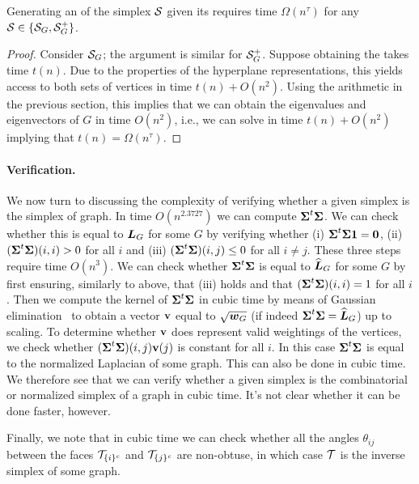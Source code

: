 \begin{lemma}
	\label{lem:hdesc_to_vdesc}
	Generating an \vdesc of the simplex $\mathcal{S}$ given its \hdesc requires time $\Omega(n^\tau)$ for any $\mathcal{S}\in\{\mathcal{S}_G,\mathcal{S}_G^+\}$. 
\end{lemma}
\begin{proof}
	Consider $\mathcal{S}_G$; the argument is similar for $\mathcal{S}_G^+$. Suppose obtaining the \hdesc takes time $t(n)$. Due to the properties of the hyperplane representations, this yields access to both sets of vertices in time $t(n)+O(n^2)$. Using the arithmetic in the previous section, this implies that we can obtain the eigenvalues and eigenvectors of $G$ in time $O(n^2)$, i.e., we can solve \lapdecomp in time $t(n)+O(n^2)$ implying that $t(n)=\Omega(n^\tau)$. 
\end{proof}


\paragraph{Verification.}
We  now turn  to discussing the complexity of  verifying whether  a given simplex is the simplex of graph. 
In time $O(n^{2.3727})$ we can compute $\boldsymbol{\Sigma}^t\boldsymbol{\Sigma}$. We can check whether this is equal to $\vb*{L}_G$ for some $G$ by verifying whether (i) $\boldsymbol{\Sigma}^t\boldsymbol{\Sigma}\vb{1}=\vb{0}$, (ii) $(\boldsymbol{\Sigma}^t\boldsymbol{\Sigma})(i,i)>0$ for all $i$ and (iii) $(\boldsymbol{\Sigma}^t\boldsymbol{\Sigma})(i,j)\leq 0$ for all $i\neq j$. These three steps require time $O(n^3)$. We can check whether $\boldsymbol{\Sigma}^t\boldsymbol{\Sigma}$ is equal to $\widehat{\vb*{L}}_G$ for some $G$ by first ensuring, similarly to above, that (iii) holds and that $(\boldsymbol{\Sigma}^t\boldsymbol{\Sigma})(i,i)=1$ for all $i$. Then we compute the kernel  of $\boldsymbol{\Sigma}^t\boldsymbol{\Sigma}$ in cubic time by means of Gaussian elimination~\cite{kailath1999fast} to obtain a vector $\vb{v}$ equal to $\sqrt{\vb*{w}_G}$ (if indeed $\boldsymbol{\Sigma}^t\boldsymbol{\Sigma}=\widehat{\vb*{L}}_G$) up to scaling. To determine whether $\vb{v}$ does represent valid weightings of the vertices, we check whether $(\boldsymbol{\Sigma}^t\boldsymbol{\Sigma})(i,j)\vb{v}(j)$ is constant for all $i$. In  this case $\boldsymbol{\Sigma}^t\boldsymbol{\Sigma}$ is equal to the normalized Laplacian of some graph. This can also be done in cubic time. We  therefore see that we can  verify whether a given simplex is the combinatorial or  normalized simplex of a graph in  cubic time. It's not clear whether it can be done faster, however. 

Finally, we note that in cubic time we can check whether all the angles $\theta_{ij}$ between the faces $\mathcal{T}_{\{i\}^c}$ and $\mathcal{T}_{\{j\}^c}$ are non-obtuse, in which case $\mathcal{T}$ is the inverse simplex of some graph. 


